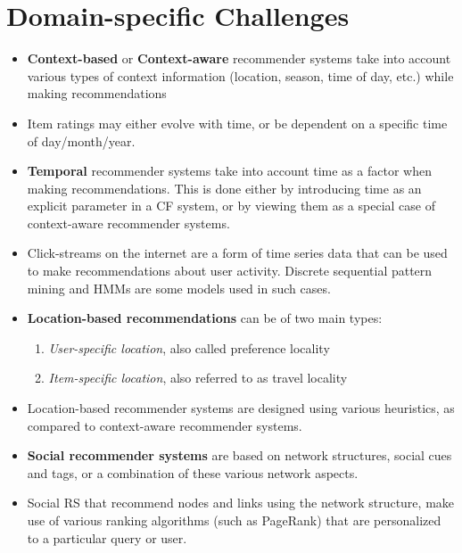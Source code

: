 \documentclass{article}
\begin{document}
\section{Domain-specific Challenges}
\begin{itemize}
    \item \textbf{Context-based} or \textbf{Context-aware} recommender systems take into account various types of context information (location, season, time of day, etc.) while making recommendations
    
    \item Item ratings may either evolve with time, or be dependent on a specific time of day/month/year. 
    
    \item \textbf{Temporal} recommender systems take into account time as a factor when making recommendations. This is done either by introducing time as an explicit parameter in a CF system, or by viewing them as a special case of context-aware recommender systems.
    
    \item Click-streams on the internet are a form of time series data that can be used to make recommendations about user activity. Discrete sequential pattern mining and HMMs are some models used in such cases.
    
    \item \textbf{Location-based recommendations} can be of two main types:
    \begin{enumerate}
        \item \textit{User-specific location}, also called preference locality
        
        \item \textit{Item-specific location}, also referred to as travel locality
    \end{enumerate}
    
    \item Location-based recommender systems are designed using various heuristics, as compared to context-aware recommender systems. 
    
    \item \textbf{Social recommender systems} are based on network structures, social cues and tags, or a combination of these various network aspects.
    
    \item Social RS that recommend nodes and links using the network structure, make use of various ranking algorithms (such as PageRank) that are personalized to a particular query or user.
    

\end{itemize}
\end{document}
